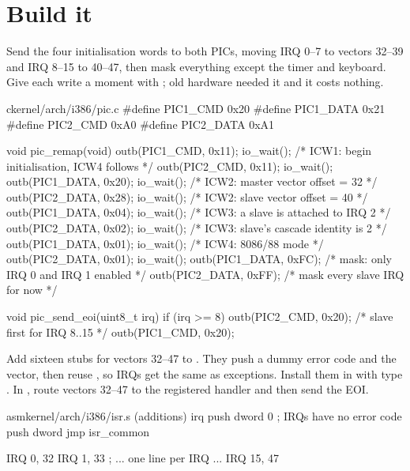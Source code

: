 \documentclass[11pt,a4paper]{article}
\begin{document}
\section{Build it}

Send the four initialisation words to both PICs, moving IRQ 0--7 to vectors 32--39 and IRQ 8--15 to 40--47, then mask
everything except the timer and keyboard. Give each write a moment with ; old hardware needed it and
it costs nothing.

\begin{lst}{c}{kernel/arch/i386/pic.c}
#define PIC1_CMD  0x20
#define PIC1_DATA 0x21
#define PIC2_CMD  0xA0
#define PIC2_DATA 0xA1

void pic_remap(void)
{
    outb(PIC1_CMD,  0x11); io_wait();   /* ICW1: begin initialisation, ICW4 follows */
    outb(PIC2_CMD,  0x11); io_wait();
    outb(PIC1_DATA, 0x20); io_wait();   /* ICW2: master vector offset = 32          */
    outb(PIC2_DATA, 0x28); io_wait();   /* ICW2: slave vector offset  = 40          */
    outb(PIC1_DATA, 0x04); io_wait();   /* ICW3: a slave is attached to IRQ 2       */
    outb(PIC2_DATA, 0x02); io_wait();   /* ICW3: slave's cascade identity is 2      */
    outb(PIC1_DATA, 0x01); io_wait();   /* ICW4: 8086/88 mode                       */
    outb(PIC2_DATA, 0x01); io_wait();
    outb(PIC1_DATA, 0xFC);              /* mask: only IRQ 0 and IRQ 1 enabled       */
    outb(PIC2_DATA, 0xFF);              /* mask every slave IRQ for now             */
}

void pic_send_eoi(uint8_t irq)
{
    if (irq >= 8)
        outb(PIC2_CMD, 0x20);           /* slave first for IRQ 8..15 */
    outb(PIC1_CMD, 0x20);
}
\end{lst}

Add sixteen stubs for vectors 32--47 to . They push a dummy error code and the vector, then reuse
, so IRQs get the same  as exceptions. Install them in  with type
. In , route vectors 32--47 to the registered handler and then send the EOI.

\begin{lst}{asm}{kernel/arch/i386/isr.s (additions)}
irq%
    push dword 0            ; IRQs have no error code
    push dword %
    jmp  isr_common

IRQ 0, 32
IRQ 1, 33
; ... one line per IRQ ...
IRQ 15, 47
\end{lst}
\end{document}
